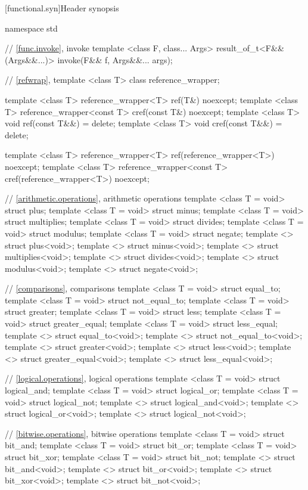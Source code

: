 [functional.syn]{Header  synopsis}

%
%
\begin{codeblock}
namespace std {
  // \ref{func.invoke}, invoke
  template <class F, class... Args>
    result_of_t<F&&(Args&&...)> invoke(F&& f, Args&&... args);

  // \ref{refwrap}, 
  template <class T> class reference_wrapper;

  template <class T> reference_wrapper<T> ref(T&) noexcept;
  template <class T> reference_wrapper<const T> cref(const T&) noexcept;
  template <class T> void ref(const T&&) = delete;
  template <class T> void cref(const T&&) = delete;

  template <class T> reference_wrapper<T> ref(reference_wrapper<T>) noexcept;
  template <class T> reference_wrapper<const T> cref(reference_wrapper<T>) noexcept;

  // \ref{arithmetic.operations}, arithmetic operations
  template <class T = void> struct plus;
  template <class T = void> struct minus;
  template <class T = void> struct multiplies;
  template <class T = void> struct divides;
  template <class T = void> struct modulus;
  template <class T = void> struct negate;
  template <> struct plus<void>;
  template <> struct minus<void>;
  template <> struct multiplies<void>;
  template <> struct divides<void>;
  template <> struct modulus<void>;
  template <> struct negate<void>;

  // \ref{comparisons}, comparisons
  template <class T = void> struct equal_to;
  template <class T = void> struct not_equal_to;
  template <class T = void> struct greater;
  template <class T = void> struct less;
  template <class T = void> struct greater_equal;
  template <class T = void> struct less_equal;
  template <> struct equal_to<void>;
  template <> struct not_equal_to<void>;
  template <> struct greater<void>;
  template <> struct less<void>;
  template <> struct greater_equal<void>;
  template <> struct less_equal<void>;

  // \ref{logical.operations}, logical operations
  template <class T = void> struct logical_and;
  template <class T = void> struct logical_or;
  template <class T = void> struct logical_not;
  template <> struct logical_and<void>;
  template <> struct logical_or<void>;
  template <> struct logical_not<void>;

  // \ref{bitwise.operations}, bitwise operations
  template <class T = void> struct bit_and;
  template <class T = void> struct bit_or;
  template <class T = void> struct bit_xor;
  template <class T = void> struct bit_not;
  template <> struct bit_and<void>;
  template <> struct bit_or<void>;
  template <> struct bit_xor<void>;
  template <> struct bit_not<void>;

}
\end{codeblock}

